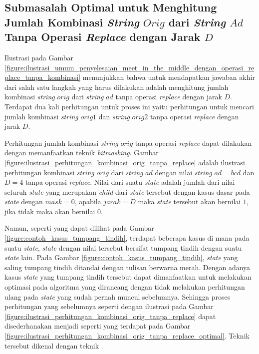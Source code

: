 \subsection{Submasalah Optimal untuk Menghitung Jumlah Kombinasi \textit{String} $ Orig $ dari \textit{String} $ Ad $ Tanpa Operasi \textit{Replace} dengan Jarak $D$}
\label{subsec:submasalah_optimal_untuk_menghitung_jumlah_kombinasi_string_orig_dari_string_ad_tanpa_operasi_replace}
Ilustrasi pada Gambar \ref{figure:ilustrasi_umum_penyelesaian_meet_in_the_middle_dengan_operasi_replace_tanpa_kombinasi} menunjukkan bahwa untuk mendapatkan jawaban akhir dari \problem{} salah satu langkah yang harus dilakukan adalah menghitung jumlah kombinasi \textit{string} $ orig $ dari \textit{string} $ ad $ tanpa operasi \textit{replace} dengan jarak $ D $. Terdapat dua kali perhitungan untuk proses ini yaitu perhitungan untuk mencari jumlah kombinasi \textit{string} $ orig1 $ dan \textit{string} $ orig2 $ tanpa operasi \textit{replace} dengan jarak $ D $.

Perhitungan jumlah kombinasi \textit{string} $ orig $ tanpa operasi \textit{replace} dapat dilakukan dengan memanfaatkan teknik \textit{bitmasking}. Gambar \ref{figure:ilustrasi_perhitungan_kombinasi_orig_tanpa_replace} adalah ilustrasi perhitungan kombinasi \textit{string} $ orig $ dari \textit{string} $ ad $ dengan nilai \textit{string} $ ad=bcd $ dan $ D=4 $ tanpa operasi \textit{replace}. Nilai dari suatu \textit{state} adalah jumlah dari nilai seluruh \textit{state} yang merupakan \textit{child} dari \textit{state} tersebut dengan kasus dasar pada \textit{state} dengan $ mask=0 $, apabila $ jarak=D $ maka \textit{state} tersebut akan bernilai $ 1 $, jika tidak maka akan bernilai $ 0 $.

Namun, seperti yang dapat dilihat pada Gambar \ref{figure:contoh_kasus_tumpang_tindih}, terdapat beberapa kasus di mana pada suatu \textit{state}, \textit{state} dengan nilai tersebut bersifat tumpang tindih dengan suatu \textit{state} lain. Pada Gambar \ref{figure:contoh_kasus_tumpang_tindih}, \textit{state} yang saling tumpang tindih ditandai dengan tulisan berwarna merah. Dengan adanya kasus \textit{state} yang tumpang tindih tersebut dapat dimanfaatkan untuk melakukan optimasi pada algoritma yang dirancang dengan tidak melakukan perhitungan ulang pada \textit{state} yang sudah pernah muncul sebelumnya. Sehingga proses perhitungan yang sebelumnya seperti dengan ilustrasi pada Gambar \ref{figure:ilustrasi_perhitungan_kombinasi_orig_tanpa_replace} dapat disederhanakan menjadi seperti yang terdapat pada Gambar \ref{figure:ilustrasi_perhitungan_kombinasi_orig_tanpa_replace_optimal}. Teknik tersebut dikenal dengan teknik \dynamicprogramming{}.


